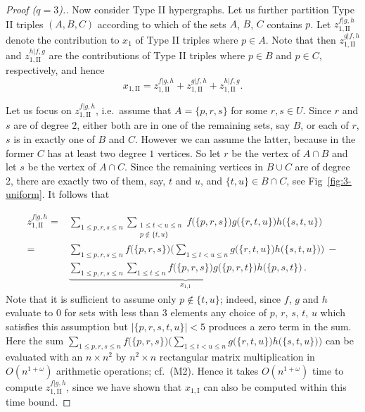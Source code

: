 \documentclass{amsart}
\begin{document}
\begin{proof}[Proof ($q=3$).]
Now consider Type II hypergraphs. 
Let us further partition Type II triples $(A,B,C)$ according to which of the sets $A$, $B$, $C$ contains $p$.
Let $z_{1,\mathrm{II}}^{f|g,h}$ denote the contribution to $x_1$ of Type II triples where $p\in A$.
Note that then $z_{1,\mathrm{II}}^{g|f,h}$ and $z_{1,\mathrm{II}}^{h|f,g}$ are the contributions of Type II triples where $p\in B$ and $p\in C$, respectively, and hence 
\begin{equation}
\label{eq:3-uniform-type-II}
 x_{1,\mathrm{II}}=z_{1,\mathrm{II}}^{f|g,h}+z_{1,\mathrm{II}}^{g|f,h}+z_{1,\mathrm{II}}^{h|f,g}.
\end{equation}

Let us focus on $z_{1,\mathrm{II}}^{f|g,h}$, i.e.\ assume that $A=\{p,r,s\}$ for some $r,s\in U$.
Since $r$ and $s$ are of degree $2$, either both are in one of the remaining sets, say $B$, or each of $r$, $s$ is in exactly one of $B$ and $C$.
However we can assume the latter, because in the former $C$ has at least two degree $1$ vertices.
So let $r$ be the vertex of $A\cap B$ and let $s$ be the vertex of $A\cap C$.
Since the remaining vertices in $B\cup C$ are of degree 2, there are exactly two of them, say, $t$ and $u$, and $\{t,u\}\in B\cap C$, see Fig~\ref{fig:3-uniform}. It follows that 

\[
\begin{split}
z_{1,\mathrm{II}}^{f|g,h}
=& 
\sum_{1\leq p,r,s\leq n}
\sum_{\substack{1\leq t<u\leq n\\p\not\in\{t,u\}}}
f\bigl(\{p,r,s\}\bigr)
g\bigl(\{r,t,u\}\bigr)
h\bigl(\{s,t,u\}\bigr)\\
=&
\sum_{1\leq p,r,s\leq n}
f\bigl(\{p,r,s\}\bigr)
\biggl(\sum_{1\leq t<u\leq n}
g\bigl(\{r,t,u\}\bigr)
h\bigl(\{s,t,u\}\bigr)
\biggr) \ -\\
& 
\underbrace{
\sum_{1\leq p,r,s\leq n}
\sum_{1\leq t\leq n}
f\bigl(\{p,r,s\}\bigr)
g\bigl(\{p,r,t\}\bigr)
h\bigl(\{p,s,t\}\bigr)}_{x_{1,\mathrm{I}}}\,.
\end{split}
\]
Note that it is sufficient to assume only $p\not\in\{t,u\}$; indeed, since $f$, $g$ and $h$ evaluate to $0$ for sets with less than 3 elements any choice of $p$, $r$, $s$, $t$, $u$ which satisfies this assumption but $|\{p,r,s,t,u\}|<5$ produces a zero term in the sum.
Here the sum $\sum_{1\leq p,r,s\leq n}
f\bigl(\{p,r,s\}\bigr)
\biggl(\sum_{1\leq t<u\leq n}
g\bigl(\{r,t,u\}\bigr)
h\bigl(\{s,t,u\}\bigr)
\biggr)$ can be evaluated with an $n\times n^2$ by 
$n^2\times n$ rectangular matrix multiplication in $O(n^{1+\omega})$
arithmetic operations; cf.~(M2). 
Hence it takes $O(n^{1+\omega})$ time to compute $z_{1,\mathrm{II}}^{f|g,h}$, since we have shown that $x_{1,\mathrm{I}}$ can also be computed within this time bound.
\end{proof}
\end{document}
